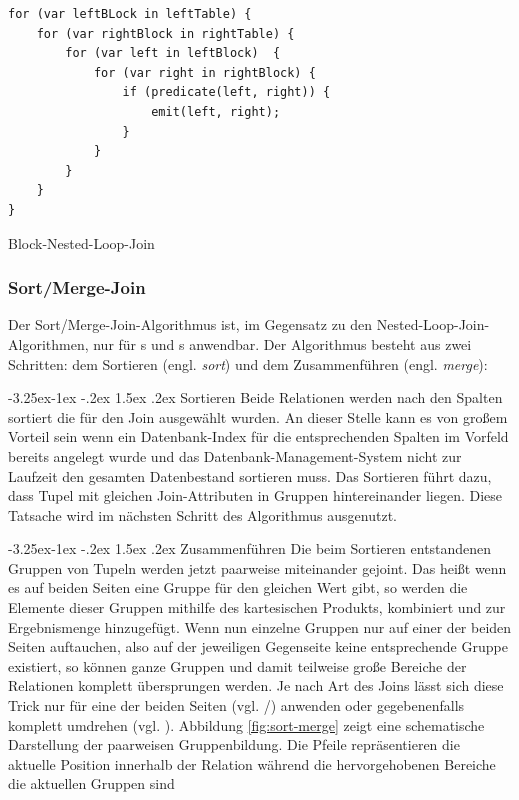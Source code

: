 \documentclass[a4paper]{article}
\makeatletter
\renewcommand\paragraph{\@startsection{paragraph}{4}{\z@}%
  {-3.25ex\@plus -1ex \@minus -.2ex}%
  {1.5ex \@plus .2ex}%
  {\normalfont\normalsize\bfseries}}
\makeatother
\begin{document}
\begin{listing}[H]
\begin{verbatim}
for (var leftBLock in leftTable) {
    for (var rightBlock in rightTable) {
        for (var left in leftBlock)  {
            for (var right in rightBlock) {
                if (predicate(left, right)) {
                    emit(left, right);
                }
            }
        }
    }
}
\end{verbatim}
\caption{Block-Nested-Loop-Join}
\label{lst:block-nested-loop}
\end{listing}

\subsubsection{Sort/Merge-Join}
Der Sort/Merge-Join-Algorithmus ist, im Gegensatz zu den Nested-Loop-Join-Algorithmen, nur für s und s anwendbar. Der Algorithmus besteht aus zwei Schritten: dem Sortieren (engl. \textit{sort}) und dem Zusammenführen (engl. \textit{merge}):

\paragraph{Sortieren}
Beide Relationen werden nach den Spalten sortiert die für den Join ausgewählt wurden. An dieser Stelle kann es von großem Vorteil sein wenn ein Datenbank-Index für die entsprechenden Spalten im Vorfeld bereits angelegt wurde und das Datenbank-Management-System nicht zur Laufzeit den gesamten Datenbestand sortieren muss. Das Sortieren führt dazu, dass Tupel mit gleichen Join-Attributen in Gruppen hintereinander liegen. Diese Tatsache wird im nächsten Schritt des Algorithmus ausgenutzt.

\paragraph{Zusammenführen}
Die beim Sortieren entstandenen Gruppen von Tupeln werden jetzt paarweise miteinander gejoint. Das heißt wenn es auf beiden Seiten eine Gruppe für den gleichen Wert gibt, so werden die Elemente dieser Gruppen mithilfe des kartesischen Produkts, kombiniert und zur Ergebnismenge hinzugefügt. Wenn nun einzelne Gruppen nur auf einer der beiden Seiten auftauchen, also auf der jeweiligen Gegenseite keine entsprechende Gruppe existiert, so können ganze Gruppen und damit teilweise große Bereiche der Relationen komplett übersprungen werden. Je nach Art des Joins lässt sich diese Trick nur für eine der beiden Seiten (vgl. /) anwenden oder gegebenenfalls komplett umdrehen (vgl. ). Abbildung \ref{fig:sort-merge} zeigt eine schematische Darstellung der paarweisen Gruppenbildung. Die Pfeile repräsentieren die aktuelle Position innerhalb der Relation während die hervorgehobenen Bereiche die aktuellen Gruppen sind
\end{document}
